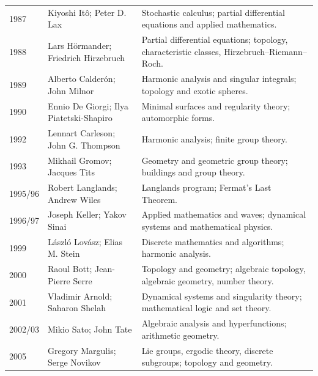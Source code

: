 {\begin{longtable}{@{}L{0.09\textwidth}L{0.38\textwidth}L{0.45\textwidth}@{}}
        1987 & Kiyoshi Itô; Peter D. Lax
        & Stochastic calculus; partial differential equations and applied mathematics. \\

        1988 & Lars Hörmander; Friedrich Hirzebruch
        & Partial differential equations; topology, characteristic classes, Hirzebruch--Riemann--Roch. \\

        1989 & Alberto Calderón; John Milnor
        & Harmonic analysis and singular integrals; topology and exotic spheres. \\

        1990 & Ennio De Giorgi; Ilya Piatetski-Shapiro
        & Minimal surfaces and regularity theory; automorphic forms. \\

        1992 & Lennart Carleson; John G. Thompson
        & Harmonic analysis; finite group theory. \\

        1993 & Mikhail Gromov; Jacques Tits
        & Geometry and geometric group theory; buildings and group theory. \\

        1995/96 & Robert Langlands; Andrew Wiles
        & Langlands program; Fermat's Last Theorem. \\

        1996/97 & Joseph Keller; Yakov Sinai
        & Applied mathematics and waves; dynamical systems and mathematical physics. \\

        1999 & László Lovász; Elias M. Stein
        & Discrete mathematics and algorithms; harmonic analysis. \\

        2000 & Raoul Bott; Jean-Pierre Serre
        & Topology and geometry; algebraic topology, algebraic geometry, number theory. \\

        2001 & Vladimir Arnold; Saharon Shelah
        & Dynamical systems and singularity theory; mathematical logic and set theory. \\

        2002/03 & Mikio Sato; John Tate
        & Algebraic analysis and hyperfunctions; arithmetic geometry. \\

        2005 & Gregory Margulis; Serge Novikov
        & Lie groups, ergodic theory, discrete subgroups; topology and geometry. \\


\end{longtable}}
